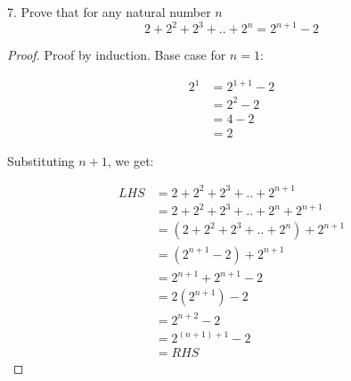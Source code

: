 \documentclass[a4paper,12pt]{article}
\begin{document}
7. Prove that for any natural number $n$ $$2 + 2^2 + 2^3 + .. + 2^n = 2^{n+1} - 2$$

\begin{proof}

  Proof by induction. Base case for $n = 1$:

  \begin{align*}
    2^1 &= 2^{1+1} - 2 \\
        &= 2^2 - 2 \\
        &= 4 - 2 \\
        &= 2
  \end{align*} 

  Substituting $n + 1$, we get:

  \begin{align*}
    LHS &= 2 + 2^2 + 2^3 + .. + 2^{n+1} \\
        &= 2 + 2^2 + 2^3 + .. + 2^n + 2^{n+1} \tag{show second to last term} \\
        &= (2 + 2^2 + 2^3 + .. + 2^n) + 2^{n+1} \tag{group first terms} \\
        &= (2^{n+1} - 2) + 2^{n+1} \tag{by inductive statement} \\
        &= 2^{n+1} + 2^{n+1} - 2 \tag{re-arrange terms} \\
        &= 2(2^{n+1}) - 2 \tag{group similar terms} \\
        &= 2^{n+2} - 2 \\
        &= 2^{(n+1)+1} - 2 \\
        &= RHS
  \end{align*} 

\end{proof}
\end{document}
